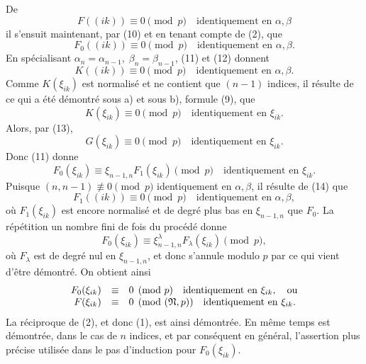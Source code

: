 De
\[
        F((ik))\equiv0\pmod p\quad \text{identiquement en $\alpha,\beta$}
\]
il s'ensuit maintenant, par (10) et en tenant compte de (2), que
\begin{equation}
        F_0((ik))\equiv0\pmod p\quad \text{identiquement en $\alpha,\beta$}.
\end{equation}
En spécialisant $\alpha_n=\alpha_{n-1},\;\beta_n=\beta_{n-1}$, (11) et (12) donnent
\begin{equation}
        K((ik))\equiv0\pmod p\quad \text{identiquement en $\alpha,\beta$}.
\end{equation}
Comme $K(\xi_{ik})$ est normalisé et ne contient que $(n-1)$ indices, il résulte de ce qui a été démontré sous a) et sous b), formule (9), que
\[
        K(\xi_{ik})\equiv0\pmod p\quad \text{identiquement en $\xi_{ik}$}.
\]
Alors, par (13),
\[
        G(\xi_{ik})\equiv0\pmod p\quad \text{identiquement en $\xi_{ik}$}.
\]
Donc (11) donne
\[
        F_0(\xi_{ik})\equiv \xi_{n-1,n}F_1(\xi_{ik})\pmod p
        \quad \text{identiquement en $\xi_{ik}$}.
\]
Puisque $(n,n-1)\not\equiv0\pmod p$ identiquement en $\alpha,\beta$, il résulte de (14) que
\[
        F_1((ik))\equiv0\pmod p\quad \text{identiquement en $\alpha,\beta$},
\]
où $F_1(\xi_{ik})$ est encore normalisé et de degré plus bas en $\xi_{n-1,n}$ que $F_0$. La répétition un nombre fini de fois du procédé donne
\[
        F_0(\xi_{ik})\equiv\xi_{n-1,n}^{\lambda}F_\lambda(\xi_{ik})\pmod p,
\]
où $F_\lambda$ est de degré nul en $\xi_{n-1,n}$, et donc s'annule modulo $p$ par ce qui vient d'être démontré. On obtient ainsi
\begin{equation}
\begin{array}{rcl}
        F_0(\xi_{ik})&\equiv&0\pmod p\quad \text{identiquement en $\xi_{ik}$},\quad\text{ou}\\
        F(\xi_{ik})&\equiv&0\pmod{(\mathfrak N,p)}\quad \text{identiquement en $\xi_{ik}$}.
\end{array}
\end{equation}
La réciproque de (2), et donc (1), est ainsi démontrée. En même temps est démontrée, dans le cas de $n$ indices, et par conséquent en général, l'assertion plus précise utilisée dans le pas d'induction pour $F_0(\xi_{ik})$.

\setcounter{equation}{0}
